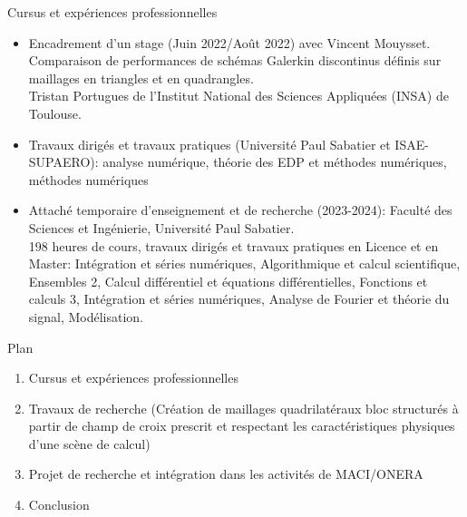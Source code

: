 \documentclass[compress,10pt,aspectratio=169]{beamer}
\begin{document}
\begin{frame}{Cursus et expériences professionnelles}
\small
\vspace{-0.2cm}
\begin{itemize}

\item {\color{onera}Encadrement d'un stage (Juin 2022/Août 2022)} avec Vincent Mouysset.\\
Comparaison de performances de schémas Galerkin discontinus définis sur maillages en triangles et en quadrangles.\\
{\color{onera_gray}Tristan Portugues de l'Institut National des Sciences Appliquées (INSA) de Toulouse.}\\\vspace{0.3cm}

\item  {\color{onera}Travaux dirigés et travaux pratiques} (Université Paul Sabatier et ISAE-SUPAERO): analyse numérique, théorie des EDP et méthodes numériques, méthodes numériques\\\vspace{0.3cm}


\item {\color{onera} Attaché temporaire d'enseignement et de recherche (2023-2024): } Faculté des Sciences et Ingénierie, Université Paul Sabatier.\\
198 heures de cours, travaux dirigés et travaux pratiques en Licence et en Master: {\color{onera_gray}Intégration et séries numériques, Algorithmique et calcul scientifique, Ensembles 2, Calcul différentiel et équations différentielles, Fonctions et calculs 3, Intégration et séries numériques, Analyse de Fourier et théorie du signal, Modélisation.}\\\vspace{0.2cm}
\end{itemize}
\end{frame}

\begin{frame}{Plan}
\vspace{-0.4cm}
\begin{enumerate}
\color{onera}
\item {\color{onera_gray}Cursus et expériences professionnelles}\\\vspace{0.5cm}
\item {\color{onera}Travaux de recherche} {\small \color{black}(Création de maillages quadrilatéraux bloc structurés à partir de champ de croix prescrit et respectant les caractéristiques physiques d'une scène de calcul)} \\\vspace{0.5cm}
\item {\color{onera_gray}Projet de recherche et intégration dans les activités de MACI/ONERA}\\\vspace{0.5cm}
\item {\color{onera_gray}Conclusion}
\end{enumerate}
\end{frame}
\end{document}
